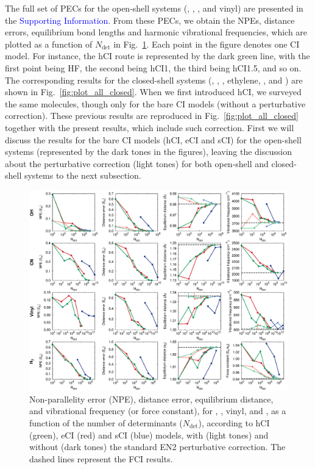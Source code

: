 \documentclass[aip,jcp,reprint,noshowkeys,superscriptaddress]{revtex4-1}
\newcommand{\SupInf}{\textcolor{blue}{Supporting Information}}
\newcommand{\Ndet}{N_\text{det}}
\begin{document}
The full set of PECs for the open-shell systems (, , , and vinyl) are presented in the {\SupInf}.
From these PECs, we obtain the NPEs, distance errors, equilibrium bond lengths and harmonic vibrational frequencies, which are plotted as a function of $\Ndet$ in Fig.~\ref{fig:plot_all}.
Each point in the figure denotes one CI model.
For instance, the hCI route is represented by the dark green line, with the first point being HF, the second being hCI1, the third being hCI1.5, and so on.
The corresponding results for the closed-shell systems (, , , ethylene, , and ) are shown in Fig.~\ref{fig:plot_all_closed}.
When we first introduced hCI, \cite{Kossoski_2022} we surveyed the same molecules, though only for the bare CI models (without a perturbative correction).
These previous results are reproduced in Fig.~\ref{fig:plot_all_closed} together with the present results, which include such correction.
First we will discuss the results for the bare CI models (hCI, eCI and sCI) for the open-shell systems (represented by the dark tones in the figures),
leaving the discussion about the perturbative correction (light tones) for both open-shell and closed-shell systems to the next subsection.

\begin{figure}%
\includegraphics[width=1.0\linewidth]{plot_all}
\caption{
Non-parallelity error (NPE), distance error, equilibrium distance, and vibrational frequency (or force constant), for , , vinyl, and ,
as a function of the number of determinants ($\Ndet$), according to hCI (green), eCI (red) and sCI (blue) models,
with (light tones) and without (dark tones) the standard EN2 perturbative correction.
The dashed lines represent the FCI results.}
\label{fig:plot_all}
\end{figure}
\end{document}
